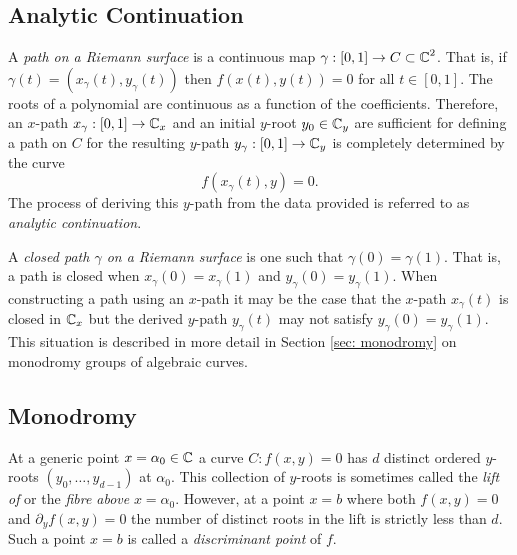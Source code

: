\subsection{Analytic Continuation}\label{subsec:background-analytic-continuation}


A {\it path on a Riemann surface} is a continuous map $\gamma : [0,1] \to C
\subset \operatorname{\mathbb{C}}^2$. That is, if $\gamma(t) = (x_\gamma(t), y_\gamma(t))$ then
$f(x(t),y(t)) = 0$ for all $t \in [0,1]$. The roots of a polynomial are
continuous as a function of the coefficients. Therefore, an $x$-path $x_\gamma :
[0,1] \to \operatorname{\mathbb{C}}_x$ and an initial $y$-root $y_0 \in \operatorname{\mathbb{C}}_y$ are sufficient for
defining a path on $C$ for the resulting $y$-path $y_\gamma : [0,1] \to \operatorname{\mathbb{C}}_y$
is completely determined by the curve
\[
  f(x_\gamma(t),y) = 0.
\]
The process of deriving this $y$-path from the data provided is referred to as
{\it analytic continuation}.

A {\it closed path $\gamma$ on a Riemann surface} is one such that $\gamma(0) =
\gamma(1)$. That is, a path is closed when $x_\gamma(0) = x_\gamma(1)$ and
$y_\gamma(0) = y_\gamma(1)$. When constructing a path using an $x$-path it may
be the case that the $x$-path $x_\gamma(t)$ is closed in $\operatorname{\mathbb{C}}_x$ but the derived
$y$-path $y_\gamma(t)$ may not satisfy $y_\gamma(0) = y_\gamma(1)$. This
situation is described in more detail in Section \ref{sec: monodromy} on
monodromy groups of algebraic curves.


\subsection{Monodromy}\label{subsec:background-monodromy}

At a generic point $x = \alpha_0 \in \operatorname{\mathbb{C}}$ a curve $C : f(x,y) = 0$ has $d$
distinct ordered $y$-roots $(y_0,\ldots,y_{d-1})$ at $\alpha_0$. This collection
of $y$-roots is sometimes called the {\it lift of} or the {\it fibre above}
$x=\alpha_0$. However, at a point $x=b$ where both $f(x,y) = 0$ and $\partial_y
f(x,y) = 0$ the number of distinct roots in the lift is strictly less than $d$.
Such a point $x = b$ is called a {\it discriminant point} of $f$.

